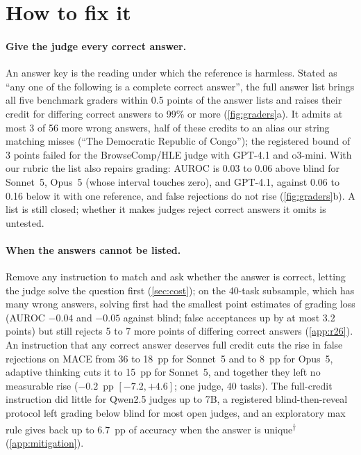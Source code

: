 \documentclass{article}
\newcommand{\ci}[2]{{\scriptsize$[#1,#2]$}}
\newcommand{\ph}{\textsuperscript{$\dagger$}}
\begin{document}
\section{How to fix it}
\label{sec:fix}

\paragraph{Give the judge every correct answer.}
An answer key is the reading under which the reference is harmless. Stated as ``any one of the following is a complete correct answer'', the full answer list brings all five benchmark graders within 0.5 points of the answer lists and raises their credit for differing correct answers to 99\% or more (\cref{fig:graders}a). It admits at most 3 of 56 more wrong answers, half of these credits to an alias our string matching misses (``The Democratic Republic of Congo''); the registered bound of 3 points failed for the BrowseComp/HLE judge with GPT-4.1 and o3-mini. With our rubric the list also repairs grading: AUROC is 0.03 to 0.06 above blind for Sonnet~5, Opus~5 (whose interval touches zero), and GPT-4.1, against 0.06 to 0.16 below it with one reference, and false rejections do not rise (\cref{fig:graders}b). A list is still closed; whether it makes judges reject correct answers it omits is untested.

\paragraph{When the answers cannot be listed.}
Remove any instruction to match and ask whether the answer is correct, letting the judge solve the question first (\cref{sec:cost}); on the 40-task subsample, which has many wrong answers, solving first had the smallest point estimates of grading loss (AUROC $-0.04$ and $-0.05$ against blind; false acceptances up by at most 3.2 points) but still rejects 5 to 7 more points of differing correct answers (\cref{app:r26}). An instruction that any correct answer deserves full credit cuts the rise in false rejections on \textsc{MACE} from 36 to 18~pp for Sonnet~5 and to 8~pp for Opus~5, adaptive thinking cuts it to 15~pp for Sonnet~5, and together they left no measurable rise ($-0.2$~pp \ci{-7.2}{+4.6}; one judge, 40 tasks). The full-credit instruction did little for Qwen2.5 judges up to 7B, a registered blind-then-reveal protocol left grading below blind for most open judges, and an exploratory max rule gives back up to 6.7~pp of accuracy when the answer is unique\ph{} (\cref{app:mitigation}).
\end{document}
